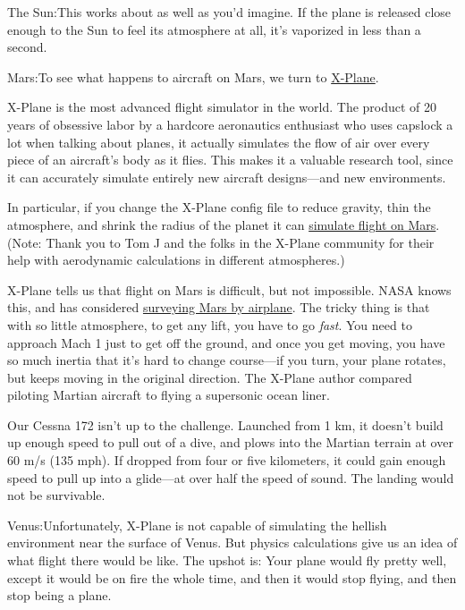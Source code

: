 {The Sun:This works about as well as you'd imagine. If the plane is released close enough to the Sun to feel its atmosphere at all, it's vaporized in less than a second.}

{Mars:To see what happens to aircraft on Mars, we turn to \href{http://www.x-plane.com/desktop/home/?utm\_expid=25103718-8}{X-Plane}.}

{X-Plane is the most advanced flight simulator in the world. The product of 20 years of obsessive labor by a hardcore aeronautics enthusiast who uses capslock a lot when talking about planes, it actually simulates the flow of air over every piece of an aircraft’s body as it flies. This makes it a valuable research tool, since it can accurately simulate entirely new aircraft designs—and new environments.}

{In particular, if you change the X-Plane config file to reduce gravity, thin the atmosphere, and shrink the radius of the planet it can \href{http://www.x-plane.com/adventures/mars.html}{simulate flight on Mars}. (Note: Thank you to Tom J and the folks in the X-Plane community for their help with aerodynamic calculations in different atmospheres.)}

{X-Plane tells us that flight on Mars is difficult, but not impossible. NASA knows this, and has considered \href{http://marsairplane.larc.nasa.gov/}{surveying Mars by airplane}. The tricky thing is that with so little atmosphere, to get any lift, you have to go \emph{fast}. You need to approach Mach 1 just to get off the ground, and once you get moving, you have so much inertia that it’s hard to change course—if you turn, your plane rotates, but keeps moving in the original direction. The X-Plane author compared piloting Martian aircraft to flying a supersonic ocean liner.}

{Our Cessna 172 isn’t up to the challenge. Launched from 1 km, it doesn’t build up enough speed to pull out of a dive, and plows into the Martian terrain at over 60 m/s (135 mph). If dropped from four or five kilometers, it could gain enough speed to pull up into a glide—at over half the speed of sound. The landing would not be survivable.}

{Venus:Unfortunately, X-Plane is not capable of simulating the hellish environment near the surface of Venus. But physics calculations give us an idea of what flight there would be like. The upshot is: Your plane would fly pretty well, except it would be on fire the whole time, and then it would stop flying, and then stop being a plane.}

